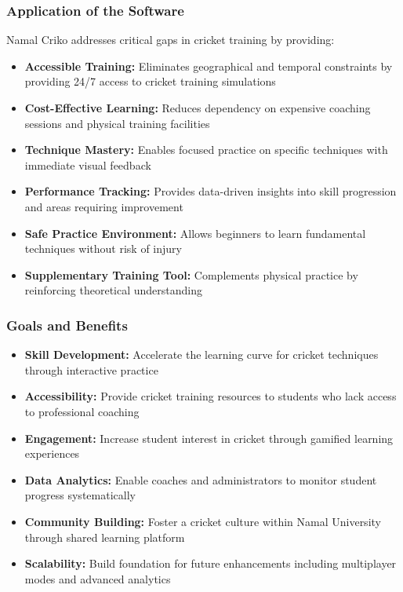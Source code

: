 \documentclass[12pt,a4paper]{article}
\begin{document}
\subsubsection{Application of the Software}
Namal Criko addresses critical gaps in cricket training by providing:
\begin{itemize}
    \item \textbf{Accessible Training:} Eliminates geographical and temporal constraints by providing 24/7 access to cricket training simulations
    \item \textbf{Cost-Effective Learning:} Reduces dependency on expensive coaching sessions and physical training facilities
    \item \textbf{Technique Mastery:} Enables focused practice on specific techniques with immediate visual feedback
    \item \textbf{Performance Tracking:} Provides data-driven insights into skill progression and areas requiring improvement
    \item \textbf{Safe Practice Environment:} Allows beginners to learn fundamental techniques without risk of injury
    \item \textbf{Supplementary Training Tool:} Complements physical practice by reinforcing theoretical understanding
\end{itemize}

\subsubsection{Goals and Benefits}
\begin{itemize}
    \item \textbf{Skill Development:} Accelerate the learning curve for cricket techniques through interactive practice
    \item \textbf{Accessibility:} Provide cricket training resources to students who lack access to professional coaching
    \item \textbf{Engagement:} Increase student interest in cricket through gamified learning experiences
    \item \textbf{Data Analytics:} Enable coaches and administrators to monitor student progress systematically
    \item \textbf{Community Building:} Foster a cricket culture within Namal University through shared learning platform
    \item \textbf{Scalability:} Build foundation for future enhancements including multiplayer modes and advanced analytics
\end{itemize}
\end{document}
